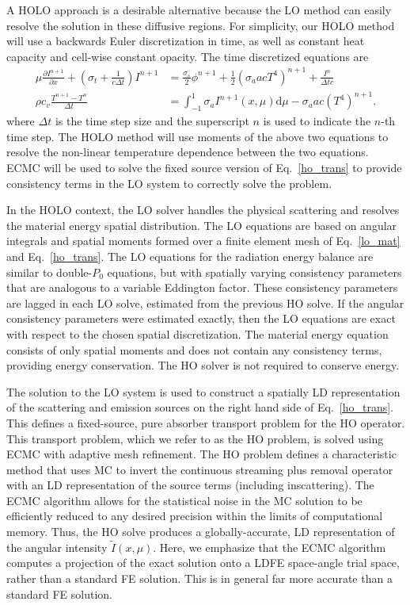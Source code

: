 \documentclass{mc2013}
\newcommand{\pderiv}[2]{\frac{\partial #1}{\partial #2}}
\renewcommand{\d}{\mathrm{d}}
\begin{document}
A HOLO approach is a desirable alternative because
the LO method can easily resolve the solution in these diffusive regions.
For simplicity, our HOLO method will use a backwards Euler discretization in time, as
well as constant heat capacity and cell-wise constant opacity. The time discretized
equations are
\begin{align}
\mu \pderiv{I^{n+1}}{x} + \left(\sigma_t + \frac{1}{c \Delta t }\right) I^{n+1}
&= \frac{\sigma_s}{2} \phi^{n+1} +\frac{1}{2} \left(\sigma_a a c T^4
\right)^{n+1} + \frac{I^n}{\Delta t c} \label{ho_trans} \\
\rho c_v \frac{T^{n+1} - T^n}{\Delta t} &= \int_{-1}^{1} \sigma_a I^{n+1}(x,\mu)
\d\mu - \sigma_a a c (T^4)^{n+1} \label{lo_mat}.
\end{align}
where $\Delta t$ is the time step size and the superscript $n$ is used to indicate
the $n$-th time step.  The HOLO method will use moments of the above two equations to
resolve the non-linear temperature dependence between the two equations.  ECMC will
be used to solve the fixed source version of Eq.~\eqref{ho_trans} to provide
consistency terms in the LO system to correctly solve the problem.


In the HOLO context, the LO solver handles the physical scattering and
resolves the material energy spatial distribution.  The LO equations are based on
angular integrals and spatial moments formed over a finite element mesh of
Eq.~\eqref{lo_mat} and Eq.~\eqref{ho_trans}. The LO equations for the radiation
energy balance are similar to
double-$P_0$ equations, but with
spatially varying consistency parameters that are analogous to a variable
Eddington factor.  These consistency parameters are lagged in each LO solve,
estimated from the previous HO solve.  
If the angular consistency parameters were estimated exactly, then the LO equations are exact with respect to the chosen
spatial discretization. The material energy equation consists of only spatial moments and does not contain
any consistency terms, providing energy conservation. The HO solver is not required
to conserve energy.

The solution to the LO system is used to construct a spatially LD representation of
the scattering and emission sources on the right hand side of Eq.~\eqref{ho_trans}.  This defines a fixed-source, pure absorber
transport problem for the HO operator.  This transport problem, which we refer to as the HO problem, is solved using ECMC with adaptive mesh
refinement.  The HO problem defines a characteristic method that uses MC to
invert the continuous streaming plus removal operator with an LD representation of
the source terms (including inscattering).  The ECMC algorithm allows for the statistical noise in the MC
solution to be efficiently reduced to any desired precision within the limits of computational memory.  Thus, the HO solve produces a
globally-accurate, LD representation of the angular intensity
$\tilde{I}(x,\mu)$.  Here, we emphasize that the ECMC algorithm computes a
projection of the exact solution onto a LDFE space-angle trial space, rather than a
standard FE solution.  This is in general far
more accurate than a standard FE solution. 
\end{document}
